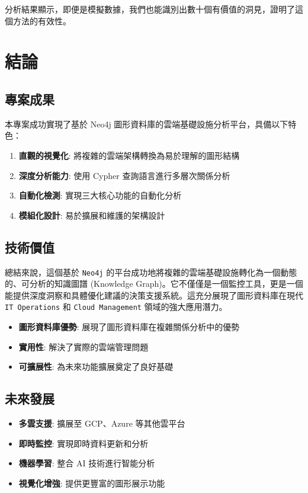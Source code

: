 \documentclass[11pt,a4paper]{ctexart}
\begin{document}
分析結果顯示，即便是模擬數據，我們也能識別出數十個有價值的洞見，證明了這個方法的有效性。

\section{結論}

\subsection{專案成果}

本專案成功實現了基於 Neo4j 圖形資料庫的雲端基礎設施分析平台，具備以下特色：

\begin{enumerate}[leftmargin=1.5em]
\item \textbf{直觀的視覺化}: 將複雜的雲端架構轉換為易於理解的圖形結構
\item \textbf{深度分析能力}: 使用 Cypher 查詢語言進行多層次關係分析
\item \textbf{自動化檢測}: 實現三大核心功能的自動化分析
\item \textbf{模組化設計}: 易於擴展和維護的架構設計
\end{enumerate}

\subsection{技術價值}

總結來說，這個基於 \texttt{Neo4j} 的平台成功地將複雜的雲端基礎設施轉化為一個動態的、可分析的知識圖譜 (Knowledge Graph)。它不僅僅是一個監控工具，更是一個能提供深度洞察和具體優化建議的決策支援系統。這充分展現了圖形資料庫在現代 \texttt{IT Operations} 和 \texttt{Cloud Management} 領域的強大應用潛力。

\begin{itemize}[leftmargin=1.5em]
\item \textbf{圖形資料庫優勢}: 展現了圖形資料庫在複雜關係分析中的優勢
\item \textbf{實用性}: 解決了實際的雲端管理問題
\item \textbf{可擴展性}: 為未來功能擴展奠定了良好基礎
\end{itemize}

\subsection{未來發展}

\begin{itemize}[leftmargin=1.5em]
\item \textbf{多雲支援}: 擴展至 GCP、Azure 等其他雲平台
\item \textbf{即時監控}: 實現即時資料更新和分析
\item \textbf{機器學習}: 整合 AI 技術進行智能分析
\item \textbf{視覺化增強}: 提供更豐富的圖形展示功能
\end{itemize}
\end{document}
